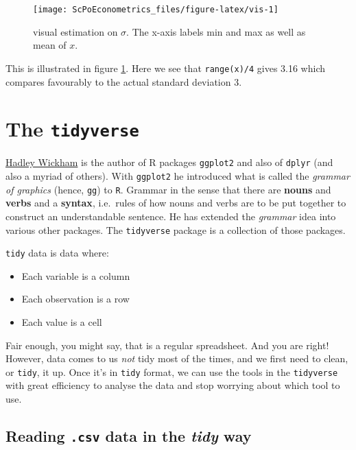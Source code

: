 \documentclass[]{book}
\providecommand{\tightlist}{%
  \setlength{\itemsep}{0pt}\setlength{\parskip}{0pt}}
\begin{document}
\begin{figure}

{\centering \texttt{[image: ScPoEconometrics\_files/figure-latex/vis-1]} 

}

\caption{visual estimation on $\sigma$. The x-axis labels min and max as well as mean of $x$.}\label{fig:vis}
\end{figure}

This is illustrated in figure \ref{fig:vis}. Here we see that
\texttt{range(x)/4} gives 3.16 which compares favourably to the actual
standard deviation 3.

\section{\texorpdfstring{The
\texttt{tidyverse}}{The tidyverse}}\label{the-tidyverse}

\href{http://hadley.nz}{Hadley Wickham} is the author of R packages
\texttt{ggplot2} and also of \texttt{dplyr} (and also a myriad of
others). With \texttt{ggplot2} he introduced what is called the
\emph{grammar of graphics} (hence, \texttt{gg}) to \texttt{R}. Grammar
in the sense that there are \textbf{nouns} and \textbf{verbs} and a
\textbf{syntax}, i.e.~rules of how nouns and verbs are to be put
together to construct an understandable sentence. He has extended the
\emph{grammar} idea into various other packages. The \texttt{tidyverse}
package is a collection of those packages.

\texttt{tidy} data is data where:

\begin{itemize}
\tightlist
\item
  Each variable is a column
\item
  Each observation is a row
\item
  Each value is a cell
\end{itemize}

Fair enough, you might say, that is a regular spreadsheet. And you are
right! However, data comes to us \emph{not} tidy most of the times, and
we first need to clean, or \texttt{tidy}, it up. Once it's in
\texttt{tidy} format, we can use the tools in the \texttt{tidyverse}
with great efficiency to analyse the data and stop worrying about which
tool to use.

\subsection{\texorpdfstring{Reading \texttt{.csv} data in the
\emph{tidy}
way}{Reading .csv data in the tidy way}}\label{reading-.csv-data-in-the-tidy-way}
\end{document}
